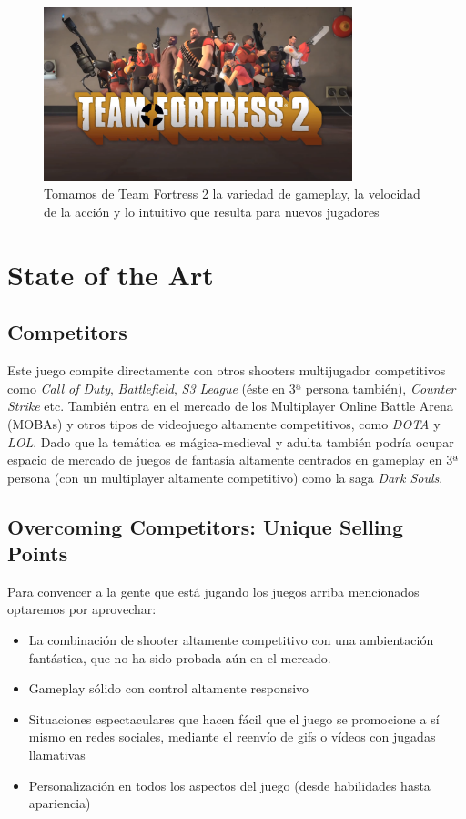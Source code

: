\documentclass[12pt]{report}
\begin{document}
\begin{figure}[h]
    \centering
    \includegraphics[width=0.8\textwidth]{tf2}
    \caption{Tomamos de Team Fortress 2 la variedad de gameplay, la velocidad de la acción y lo intuitivo que resulta para nuevos jugadores}
\end{figure}

\newpage
\section{State of the Art}
\subsection{Competitors}
Este juego compite directamente con otros shooters multijugador competitivos como \textit{Call of Duty}, \textit{Battlefield}, \textit{S3 League} (éste en 3ª persona también), \textit{Counter Strike} etc. También entra en el mercado de los Multiplayer Online Battle Arena (MOBAs) y otros tipos de videojuego altamente competitivos, como \textit{DOTA} y \textit{LOL}. Dado que la temática es mágica-medieval y adulta también podría ocupar espacio de mercado de juegos de fantasía altamente centrados en gameplay en 3ª persona (con un multiplayer altamente competitivo) como la saga \textit{Dark Souls}.

\subsection{Overcoming Competitors: Unique Selling Points}
Para convencer a la gente que está jugando los juegos arriba mencionados optaremos por aprovechar:

\begin{itemize}
\item La combinación de shooter altamente competitivo con una ambientación fantástica, que no ha sido probada aún en el mercado.
\item Gameplay sólido con control altamente responsivo
\item Situaciones espectaculares que hacen fácil que el juego se promocione a sí mismo en redes sociales, mediante el reenvío de gifs o vídeos con jugadas llamativas
\item Personalización en todos los aspectos del juego (desde habilidades hasta apariencia)
\end{itemize}
\end{document}
